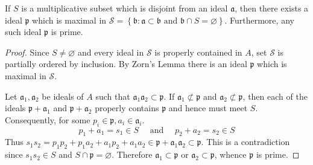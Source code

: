 \begin{proposition}
    \label{pro: The separability between ideal and multiplicative subset}
    If $S$ is a multiplicative subset which is disjoint from an ideal $\mathfrak{a}$, then there exists a ideal $\mathfrak{p}$ which is maximal in $\mathcal{S}=\left\{\mathfrak{b}: \mathfrak{a}\subset  \mathfrak{b} \text{ and }  \mathfrak{b}\cap S =\varnothing\right\}$.
    Furthermore, any such ideal $\mathfrak{p}$ is prime.
    \begin{proof}
        Since $S \neq \varnothing$ and every ideal in $\mathcal{S}$ is properly contained in $A$, set $\mathcal{S}$ is partially ordered by inclusion.
        By Zorn's Lemma there is an ideal $\mathfrak{p}$ which is maximal in $\mathcal{S}$.

        Let $\mathfrak{a}_1,\mathfrak{a}_2$ be ideals of $A$ such that $\mathfrak{a}_1\mathfrak{a}_2 \subset \mathfrak{p}$.
        If $\mathfrak{a}_1 \not \subset \mathfrak{p}$ and $\mathfrak{a}_2 \not \subset \mathfrak{p}$, then each of the ideals $\mathfrak{p}+\mathfrak{a}_1$ and $\mathfrak{p}+\mathfrak{a}_2$ properly contains $\mathfrak{p}$ and hence must meet $S$.
        Consequently, for some $p_i \in \mathfrak{p}, a_i \in \mathfrak{a}_i$.
        \begin{equation*}
            p_1+a_1=s_1 \in S \quad \text { and } \quad p_2+a_2=s_2 \in S
        \end{equation*}
        Thus $s_1 s_2=p_1 p_2+p_1 a_2+a_1 p_2+a_1 a_2 \in \mathfrak{p}+\mathfrak{a}_1 \mathfrak{a}_2 \subset \mathfrak{p}$. This is a contradiction since $s_1 s_2 \in S$ and $S \cap \mathfrak{p}=\varnothing$.
        Therefore $\mathfrak{a}_1 \subset \mathfrak{p}$ or $\mathfrak{a}_2 \subset \mathfrak{p}$, whence $\mathfrak{p}$ is prime.
    \end{proof}
\end{proposition}


